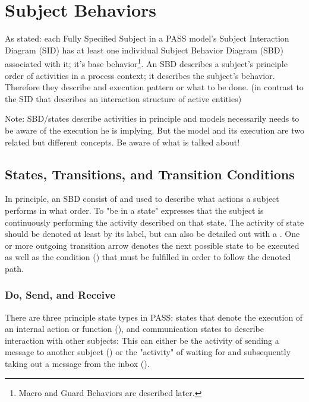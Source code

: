 \section{Subject Behaviors}
\label{sec:subjectBehavior}

As stated: each Fully Specified Subject in a PASS model's Subject Interaction Diagram (SID) has at least one individual Subject Behavior Diagram (SBD) associated with it; it's base behavior\footnote{Macro and Guard Behaviors are described later.}. An SBD describes a subject's principle order of activities in a process context; it describes the subject's behavior. Therefore they describe and execution pattern or what to be done.  (in contrast to the SID that describes an interaction structure of active entities)

Note: SBD/states describe activities in principle and models necessarily needs to be aware of the execution he is implying. But the model and its execution are two related but different concepts. Be aware of what is talked about!


\subsection{States, Transitions, and Transition Conditions}
\label{sec:statesAndTransitions}

In principle, an SBD consist of  and  used to describe what actions a subject performs in what order. To "be in a state" expresses that the subject is continuously performing the activity described on that state. The activity of state should be denoted at least by its label, but can also be detailed out with a . One or more outgoing transition arrow denotes the next possible state to be executed as well as the condition () that must be fulfilled in order to  follow the denoted path.  

\subsubsection{Do, Send, and Receive}

There are three principle state types in PASS: states that denote the execution of an internal action or function (), and communication states to describe interaction with other subjects: This can either be the activity of sending a message to another subject () or the "activity" of waiting for and subsequently taking out a message from the inbox ().

